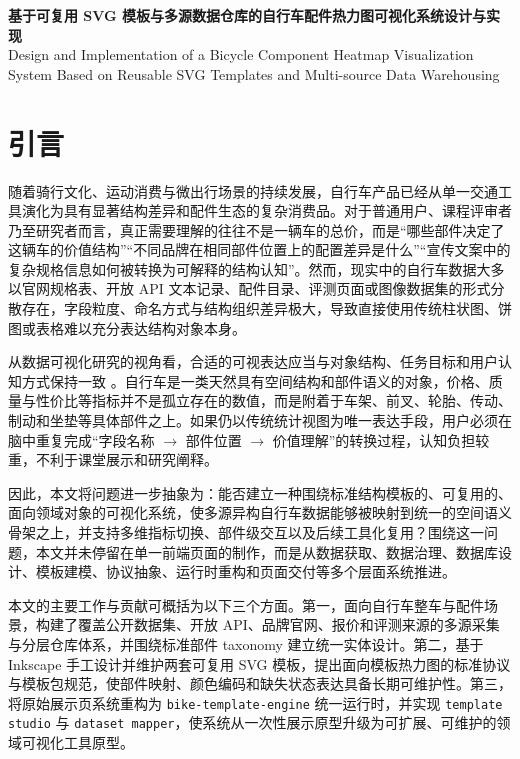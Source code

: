 \documentclass[12pt,hyperref,a4paper,UTF8]{ctexart}
\begin{document}
\thispagestyle{empty}

\newpage
\tableofcontents

\newpage

\begin{center}
    {\Huge \textbf{基于可复用 SVG 模板与多源数据仓库的自行车配件热力图可视化系统设计与实现}}\\[0.8em]
    {\large Design and Implementation of a Bicycle Component Heatmap Visualization System Based on Reusable SVG Templates and Multi-source Data Warehousing}
\end{center}

\section{引言}

随着骑行文化、运动消费与微出行场景的持续发展，自行车产品已经从单一交通工具演化为具有显著结构差异和配件生态的复杂消费品。对于普通用户、课程评审者乃至研究者而言，真正需要理解的往往不是一辆车的总价，而是“哪些部件决定了这辆车的价值结构”“不同品牌在相同部件位置上的配置差异是什么”“宣传文案中的复杂规格信息如何被转换为可解释的结构认知”。然而，现实中的自行车数据大多以官网规格表、开放 API 文本记录、配件目录、评测页面或图像数据集的形式分散存在，字段粒度、命名方式与结构组织差异极大，导致直接使用传统柱状图、饼图或表格难以充分表达结构对象本身。

从数据可视化研究的视角看，合适的可视表达应当与对象结构、任务目标和用户认知方式保持一致 \cite{Munzner2014,Tufte2001,Ware2020}。自行车是一类天然具有空间结构和部件语义的对象，价格、质量与性价比等指标并不是孤立存在的数值，而是附着于车架、前叉、轮胎、传动、制动和坐垫等具体部件之上。如果仍以传统统计视图为唯一表达手段，用户必须在脑中重复完成“字段名称 $\rightarrow$ 部件位置 $\rightarrow$ 价值理解”的转换过程，认知负担较重，不利于课堂展示和研究阐释。

因此，本文将问题进一步抽象为：能否建立一种围绕标准结构模板的、可复用的、面向领域对象的可视化系统，使多源异构自行车数据能够被映射到统一的空间语义骨架之上，并支持多维指标切换、部件级交互以及后续工具化复用？围绕这一问题，本文并未停留在单一前端页面的制作，而是从数据获取、数据治理、数据库设计、模板建模、协议抽象、运行时重构和页面交付等多个层面系统推进。

本文的主要工作与贡献可概括为以下三个方面。第一，面向自行车整车与配件场景，构建了覆盖公开数据集、开放 API、品牌官网、报价和评测来源的多源采集与分层仓库体系，并围绕标准部件 taxonomy 建立统一实体设计。第二，基于 Inkscape 手工设计并维护两套可复用 SVG 模板，提出面向模板热力图的标准协议与模板包规范，使部件映射、颜色编码和缺失状态表达具备长期可维护性。第三，将原始展示页系统重构为 \texttt{bike-template-engine} 统一运行时，并实现 \texttt{template studio} 与 \texttt{dataset mapper}，使系统从一次性展示原型升级为可扩展、可维护的领域可视化工具原型。
\end{document}
